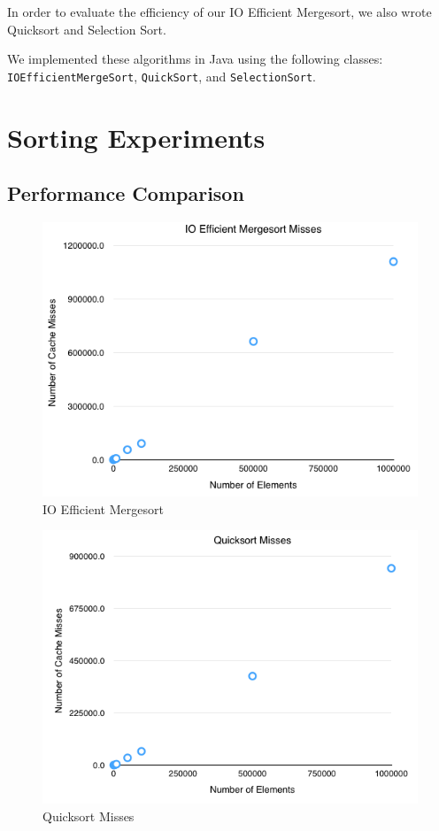 \documentclass[11pt]{article}
\begin{document}
In order to evaluate the efficiency of our IO Efficient Mergesort, we also wrote Quicksort and Selection Sort.

We implemented these algorithms in Java using the following classes: \texttt{IOEfficientMergeSort}, \texttt{QuickSort}, and \texttt{SelectionSort}.

\section{Sorting Experiments}

\subsection{Performance Comparison}

\begin{figure}[H]  
\includegraphics[scale=0.6]{figures/IOEfficientMisses.png}
\caption{IO Efficient Mergesort}
\label{listrankingio}
\end{figure}

\begin{figure}[H]  
\includegraphics[scale=0.6]{figures/QuicksortMisses.png}
\caption{Quicksort Misses}
\label{listrankingio}
\end{figure}
\end{document}
